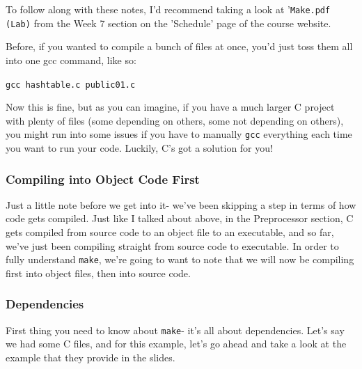 \documentclass[english, 10pt]{article}
\begin{document}
To follow along with these notes, I'd recommend taking a look at '\texttt{Make.pdf (Lab)} from the Week 7 section on the 'Schedule' page of the course website.\newline

Before, if you wanted to compile a bunch of files at once, you'd just toss them all into one gcc command, like so:\newline

\texttt{gcc hashtable.c public01.c}\newline

Now this is fine, but as you can imagine, if you have a much larger C project with plenty of files (some depending on others, some not depending on others), you might run into some issues if you have to manually \texttt{gcc} everything each time you want to run your code. Luckily, C's got a solution for you!\newline

\subsubsection{Compiling into Object Code First}

Just a little note before we get into it- we've been skipping a step in terms of how code gets compiled. Just like I talked about above,  in the Preprocessor section, C gets compiled from source code to an object file to an executable, and so far, we've just been compiling straight from source code to executable. In order to fully understand \texttt{make}, we're going to want to note that we will now be compiling first into object files, then into source code.

\subsubsection{Dependencies}

First thing you need to know about \texttt{make}- it's all about dependencies. Let's say we had some C files, and for this example, let's go ahead and take a look at the example that they provide in the slides.\newline
\end{document}
